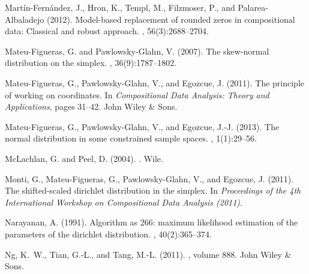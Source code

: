 \documentclass[preprint, review, 3p, authoryear]{elsarticle}
\begin{document}
\begin{thebibliography}{00}
Mart\'in-Fern\'andez, J., Hron, K., Templ, M., Filzmoser, P., and
  Palarea-Albaladejo (2012).
\newblock Model-based replacement of rounded zeros in compositional data:
  Classical and robust approach.
, 56(3):2688--2704.

Mateu-Figueras, G. and Pawlowsky-Glahn, V. (2007).
\newblock The skew-normal distribution on the simplex.
, 36(9):1787--1802.

Mateu-Figueras, G., Pawlowsky-Glahn, V., and Egozcue, J. (2011).
\newblock The principle of working on coordinates.
\newblock In {\em Compositional Data Analysis: Theory and Applications}, pages
  31--42. John Wiley \& Sons.

Mateu-Figueras, G., Pawlowsky-Glahn, V., and Egozcue, J.-J. (2013).
\newblock The normal distribution in some constrained sample spaces.
,
  1(1):29--56.

McLachlan, G. and Peel, D. (2004).
.
\newblock Wile.


Monti, G., Mateu-Figueras, G., Pawlowsky-Glahn, V., and Egozcue, J. (2011).
\newblock The shifted-scaled dirichlet distribution in the simplex.
\newblock In {\em Proceedings of the 4th International Workshop on
  Compositional Data Analysis (2011)}.

Narayanan, A. (1991).
\newblock Algorithm as 266: maximum likelihood estimation of the parameters of
  the dirichlet distribution.
, 40(2):365--374.

Ng, K.~W., Tian, G.-L., and Tang, M.-L. (2011).
, volume 888.
\newblock John Wiley \& Sons.


\end{thebibliography}
\end{document}
